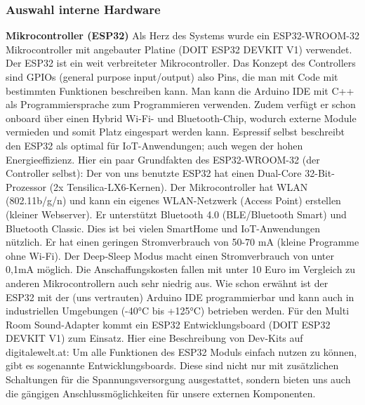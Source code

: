 \documentclass[11pt, twoside]{article}
\begin{document}
\subsubsection{Auswahl interne Hardware}
\textbf{Mikrocontroller (ESP32)}\newline
Als Herz des Systems wurde ein ESP32-WROOM-32 Mikrocontroller mit angebauter Platine (DOIT ESP32 DEVKIT V1) verwendet. Der ESP32 ist ein weit verbreiteter Mikrocontroller. Das Konzept des Controllers sind GPIOs (general purpose input/output) also Pins, die man mit Code mit bestimmten Funktionen beschreiben kann. Man kann die Arduino IDE mit C++ als Programmiersprache zum Programmieren verwenden. Zudem verfügt er schon onboard über einen Hybrid Wi-Fi- und Bluetooth-Chip, wodurch externe Module vermieden und somit Platz eingespart werden kann. Espressif selbst beschreibt den ESP32 als optimal für IoT-Anwendungen; auch wegen der hohen Energieeffizienz.\newline
Hier ein paar Grundfakten des ESP32-WROOM-32 (der Controller selbst):\newline
Der von uns benutzte ESP32 hat einen Dual-Core 32-Bit-Prozessor (2x Tensilica-LX6-Kernen). Der Mikrocontroller hat WLAN (802.11b/g/n) und kann ein eigenes WLAN-Netzwerk (Access Point) erstellen (kleiner Webserver). Er unterstützt Bluetooth 4.0 (BLE/Bluetooth Smart) und Bluetooth Classic. Dies ist bei vielen SmartHome und IoT-Anwendungen nützlich. Er hat einen geringen Stromverbrauch von 50-70 mA (kleine Programme ohne Wi-Fi). Der Deep-Sleep Modus macht einen Stromverbrauch von unter 0,1mA möglich. Die Anschaffungskosten fallen mit unter 10 Euro im Vergleich zu anderen Mikrocontrollern auch sehr niedrig aus.\newline
Wie schon erwähnt ist der ESP32 mit der (uns vertrauten) Arduino IDE programmierbar und kann auch in industriellen Umgebungen (-40°C bis +125°C) betrieben werden.\newline
Für den Multi Room Sound-Adapter kommt ein ESP32 Entwicklungsboard (DOIT ESP32 DEVKIT V1) zum Einsatz.\newline
Hier eine Beschreibung von Dev-Kits auf digitalewelt.at: \glqq Um alle Funktionen des ESP32 Moduls einfach nutzen zu können, gibt es sogenannte Entwicklungsboards. Diese sind nicht nur mit zusätzlichen Schaltungen für die Spannungsversorgung ausgestattet, sondern bieten uns auch die gängigen Anschlussmöglichkeiten für unsere externen Komponenten.\grqq{} \parencite{noauthor_urlnl07_2023}\newline \newline
\end{document}
